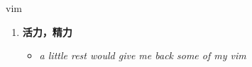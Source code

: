 
\begin{frame}
{\huge vim}
\begin{center}
\begin{enumerate}\Large
  \item \textbf{活力，精力}
  \begin{itemize}
    \item \em{\Large{a little rest would give me back some of my vim}}
  \end{itemize}
\end{enumerate}
\end{center}
\end{frame}
